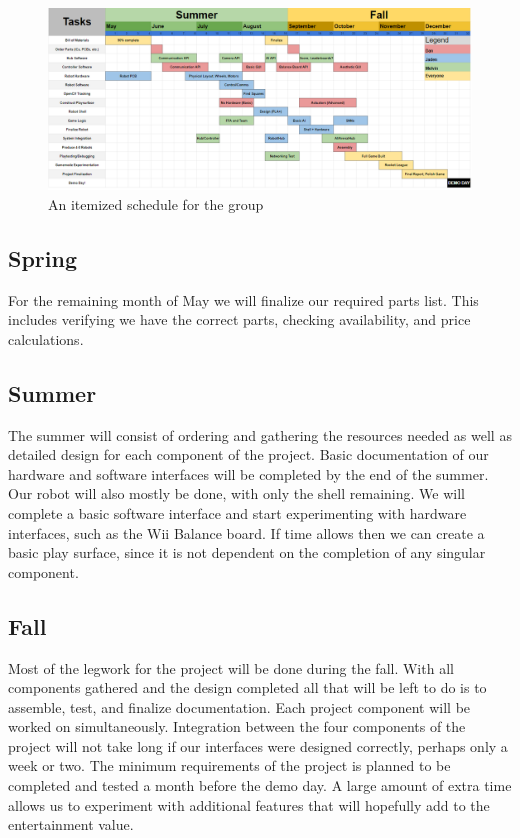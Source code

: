 \documentclass[11pt]{ieeeconf}
\begin{document}
 \begin{figure}[!t]
  \centering
  \captionsetup{justification=centering}
      \includegraphics[width=\textwidth]{images/schedule.png}
        \caption{An itemized schedule for the group}
        \label{schedule}
\end{figure}

\subsection{Spring}
For the remaining month of May we will finalize our required parts list. This includes verifying we have the correct parts, checking availability, and price calculations. 

\subsection{Summer}
The summer will consist of ordering and gathering the resources needed as well as detailed design for each component of the project. Basic documentation of our hardware and software interfaces will be completed by the end of the summer. Our robot will also mostly be done, with only the shell remaining. We will complete a basic software interface and start experimenting with hardware interfaces, such as the Wii Balance board. If time allows then we can create a basic play surface, since it is not dependent on the completion of any singular component.

\subsection{Fall}
Most of the legwork for the project will be done during the fall. With all components gathered and the design completed all that will be left to do is to assemble, test, and finalize documentation. Each project component will be worked on simultaneously. Integration between the four components of the project will not take long if our interfaces were designed correctly, perhaps only a week or two. The minimum requirements of the project is planned to be completed and tested a month before the demo day. A large amount of extra time allows us to experiment with additional features that will hopefully add to the entertainment value.
\end{document}
